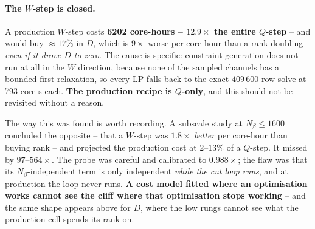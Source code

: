 \documentclass{article}
\numberwithin{equation}{section}   %
\begin{document}
\paragraph{The $W$-step is closed.}
A production $W$-step costs {\bf 6202 core-hours -- $12.9\times$ the entire $Q$-step} -- and
would buy $\approx 17\%$ in $D$, which is $9\times$ worse per core-hour than a rank doubling
{\em even if it drove $D$ to zero}. The cause is specific: constraint generation does not run
at all in the $W$ direction, because none of the sampled channels has a bounded first
relaxation, so every LP falls back to the exact $409\,600$-row solve at 793 core-s each. {\bf
The production recipe is $Q$-only}, and this should not be revisited without a reason.

The way this was found is worth recording. A subscale study at $N_\beta \le 1600$ concluded the
opposite -- that a $W$-step was $1.8\times$ {\em better} per core-hour than buying rank -- and
projected the production cost at $2$--$13\%$ of a $Q$-step. It missed by $97$--$564\times$. The
probe was careful and calibrated to $0.988\times$; the flaw was that its $N_\beta$-independent
term is only independent {\em while the cut loop runs}, and at production the loop never runs.
{\bf A cost model fitted where an optimisation works cannot see the cliff where that
optimisation stops working} -- and the same shape appears above for $D$, where the low rungs
cannot see what the production cell spends its rank on.
\end{document}
